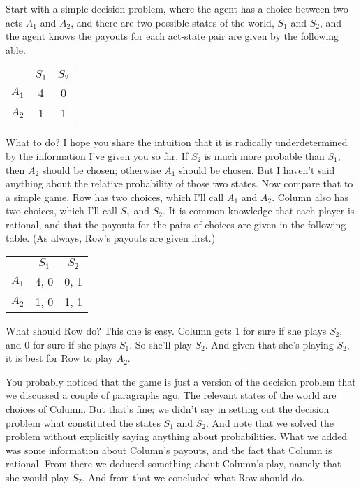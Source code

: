Start with a simple decision problem, where the agent has a choice between two acts $A_1$ and $A_2$, and there are two possible states of the world, $S_1$ and $S_2$, and the agent knows the payouts for each act-state pair are given by the following able.

\begin{center}
\begin{tabular}{r c c}
 & $S_1$ & $S_2$ \\
$A_1$ & 4 & 0 \\
$A_2$ & 1 & 1 
\end{tabular}
\end{center}

\noindent What to do? I hope you share the intuition that it is radically underdetermined by the information I've given you so far. If $S_2$ is much more probable than $S_1$, then $A_2$ should be chosen; otherwise $A_1$ should be chosen. But I haven't said anything about the relative probability of those two states. Now compare that to a simple game. Row has two choices, which I'll call $A_1$ and $A_2$. Column also has two choices, which I'll call $S_1$ and $S_2$. It is common knowledge that each player is rational, and that the payouts for the pairs of choices are given in the following table. (As always, Row's payouts are given first.)

\begin{center}
\begin{tabular}{r c c}
 & $S_1$ & $S_2$ \\
$A_1$ & 4, 0 & 0, 1 \\
$A_2$ & 1, 0 & 1, 1 
\end{tabular}
\end{center}

\noindent What should Row do? This one is easy. Column gets 1 for sure if she plays $S_2$, and 0 for sure if she plays $S_1$. So she'll play $S_2$. And given that she's playing $S_2$, it is best for Row to play $A_2$.

You probably noticed that the game is just a version of the decision problem that we discussed a couple of paragraphs ago. The relevant states of the world are choices of Column. But that's fine; we didn't say in setting out the decision problem what constituted the states $S_1$ and $S_2$. And note that we solved the problem without explicitly saying anything about probabilities. What we added was some information about Column's payouts, and the fact that Column is rational. From there we deduced something about Column's play, namely that she would play $S_2$. And from that we concluded what Row should do.

